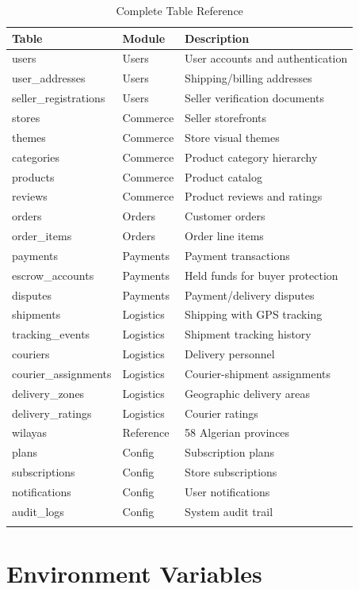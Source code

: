 \documentclass[12pt,a4paper]{report}
\begin{document}
\begin{longtable}{llp{6cm}}
\toprule
\textbf{Table} & \textbf{Module} & \textbf{Description} \\
\midrule
\endhead
users & Users & User accounts and authentication \\
user\_addresses & Users & Shipping/billing addresses \\
seller\_registrations & Users & Seller verification documents \\
stores & Commerce & Seller storefronts \\
themes & Commerce & Store visual themes \\
categories & Commerce & Product category hierarchy \\
products & Commerce & Product catalog \\
reviews & Commerce & Product reviews and ratings \\
orders & Orders & Customer orders \\
order\_items & Orders & Order line items \\
payments & Payments & Payment transactions \\
escrow\_accounts & Payments & Held funds for buyer protection \\
disputes & Payments & Payment/delivery disputes \\
shipments & Logistics & Shipping with GPS tracking \\
tracking\_events & Logistics & Shipment tracking history \\
couriers & Logistics & Delivery personnel \\
courier\_assignments & Logistics & Courier-shipment assignments \\
delivery\_zones & Logistics & Geographic delivery areas \\
delivery\_ratings & Logistics & Courier ratings \\
wilayas & Reference & 58 Algerian provinces \\
plans & Config & Subscription plans \\
subscriptions & Config & Store subscriptions \\
notifications & Config & User notifications \\
audit\_logs & Config & System audit trail \\
\bottomrule
\caption{Complete Table Reference}
\end{longtable}

\chapter{Environment Variables}
\end{document}
